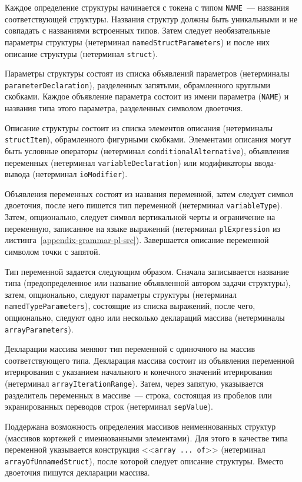 \documentclass[times,specification,annotation]{style/itmo-student-thesis/itmo-student-thesis}
\begin{document}
Каждое определение структуры начинается с токена с типом \texttt{NAME}~--- названия соответствующей структуры. Названия структур должны быть уникальными и не совпадать с названиями встроенных типов. Затем следует необязательные параметры структуры (нетерминал \texttt{namedStructParameters}) и после них описание структуры (нетерминал \texttt{struct}).

Параметры структуры состоят из списка объявлений параметров (нетерминалы \texttt{parameterDeclaration}), разделенных запятыми, обрамленного круглыми скобками. Каждое объявление параметра состоит из имени параметра (\texttt{NAME}) и названия типа этого параметра, разделенных символом двоеточия.

Описание структуры состоит из списка элементов описания (нетерминалы \texttt{structItem}), обрамленного фигурными скобками. Элементами описания могут быть условные операторы (нетерминал \texttt{conditionalAlternative}), объявления переменных (нетерминал \texttt{variableDeclaration}) или модификаторы ввода-вывода (нетерминал \texttt{ioModifier}).

Объявления переменных состоят из названия переменной, затем следует символ двоеточия, после него пишется тип переменной (нетерминал \texttt{variableType}). Затем, опционально, следует символ вертикальной черты и ограничение на переменную, записанное на языке выражений (нетерминал \texttt{plExpression} из листинга~\ref{appendix-grammar-pl-src}). Завершается описание переменной символом точки с запятой.

Тип переменной задается следующим образом. Сначала записывается название типа (предопределенное или название объявленной автором задачи структуры), затем, опционально, следуют параметры структуры (нетерминал \texttt{namedTypeParameters}), состоящие из списка выражений, после чего, опционально, следуют одно или несколько деклараций массива (нетерминалы \texttt{arrayParameters}).

Декларации массива меняют тип переменной с одиночного на массив соответствующего типа. Декларация массива состоит из объявления переменной итерирования с указанием начального и конечного значений итерирования (нетерминал \texttt{arrayIterationRange}). Затем, через запятую, указывается разделитель переменных в массиве~--- строка, состоящая из пробелов или экранированных переводов строк (нетерминал \texttt{sepValue}).

Поддержана возможность определения массивов неименнованных структур (массивов кортежей с именнованными элементами). Для этого в качестве типа переменной указывается конструкция <<\texttt{array ... of}>> (нетерминал \texttt{arrayOfUnnamedStruct}), после которой следует описание структуры. Вместо двоеточия пишутся декларации массива.
\end{document}
